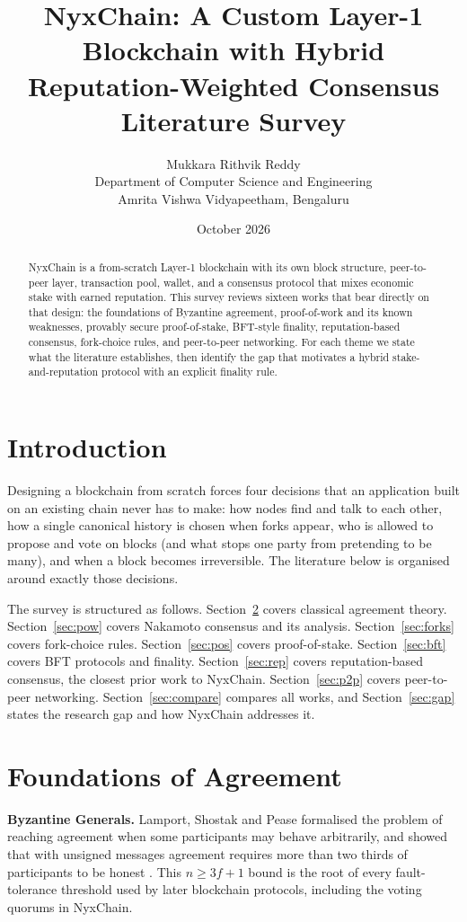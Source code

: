 \documentclass[11pt,a4paper]{article}
\title{\textbf{NyxChain: A Custom Layer-1 Blockchain with Hybrid Reputation-Weighted Consensus}\\[4pt]
\large Literature Survey}
\author{Mukkara Rithvik Reddy \\ %
Department of Computer Science and Engineering \\
Amrita Vishwa Vidyapeetham, Bengaluru}
\date{October 2026}
\begin{document}
\maketitle

\begin{abstract}
NyxChain is a from-scratch Layer-1 blockchain with its own block structure, peer-to-peer layer, transaction pool, wallet, and a consensus protocol that mixes economic stake with earned reputation. This survey reviews sixteen works that bear directly on that design: the foundations of Byzantine agreement, proof-of-work and its known weaknesses, provably secure proof-of-stake, BFT-style finality, reputation-based consensus, fork-choice rules, and peer-to-peer networking. For each theme we state what the literature establishes, then identify the gap that motivates a hybrid stake-and-reputation protocol with an explicit finality rule.
\end{abstract}

\section{Introduction}
Designing a blockchain from scratch forces four decisions that an application built on an existing chain never has to make: how nodes find and talk to each other, how a single canonical history is chosen when forks appear, who is allowed to propose and vote on blocks (and what stops one party from pretending to be many), and when a block becomes irreversible. The literature below is organised around exactly those decisions.

The survey is structured as follows. Section~\ref{sec:foundations} covers classical agreement theory. Section~\ref{sec:pow} covers Nakamoto consensus and its analysis. Section~\ref{sec:forks} covers fork-choice rules. Section~\ref{sec:pos} covers proof-of-stake. Section~\ref{sec:bft} covers BFT protocols and finality. Section~\ref{sec:rep} covers reputation-based consensus, the closest prior work to NyxChain. Section~\ref{sec:p2p} covers peer-to-peer networking. Section~\ref{sec:compare} compares all works, and Section~\ref{sec:gap} states the research gap and how NyxChain addresses it.

\section{Foundations of Agreement}\label{sec:foundations}

\textbf{Byzantine Generals.} Lamport, Shostak and Pease formalised the problem of reaching agreement when some participants may behave arbitrarily, and showed that with unsigned messages agreement requires more than two thirds of participants to be honest \cite{lamport1982}. This $n \ge 3f+1$ bound is the root of every fault-tolerance threshold used by later blockchain protocols, including the voting quorums in NyxChain.
\end{document}
